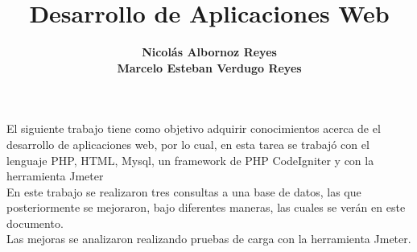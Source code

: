 \documentclass[12pt,letterpaper]{report}
\begin{document}
\title{\textbf{Desarrollo de Aplicaciones Web}}
\author{\textbf{Nicolás Albornoz Reyes\\Marcelo Esteban Verdugo Reyes  }}

\beforepreface
{}
El siguiente trabajo tiene como objetivo adquirir conocimientos acerca de el desarrollo de aplicaciones web, por lo cual, en esta tarea se trabajó con el lenguaje PHP, HTML, Mysql, un framework de PHP CodeIgniter y con la herramienta Jmeter \\

En este trabajo se realizaron tres consultas a una base de datos, las que posteriormente se mejoraron, bajo diferentes maneras, las cuales se verán en este documento. \\ 
Las mejoras se analizaron realizando pruebas de carga con la herramienta Jmeter.


\renewcommand{\thepage}{\roman{page}}
\tableofcontents
\newpage
\listoffigures
\newpage

\renewcommand{\thepage}{\arabic{page}}





\end{document}
